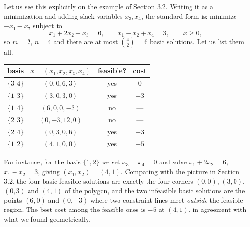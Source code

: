 \begin{example}
    Let us see this explicitly on the example of Section 3.2. Writing it as a minimization and adding slack variables $x_3, x_4$, the standard form is: minimize $-x_1 - x_2$ subject to
    $$
    x_1 + 2x_2 + x_3 = 6, \qquad x_1 - x_2 + x_4 = 3, \qquad x \geq 0,
    $$
    so $m = 2$, $n = 4$ and there are at most $\binom42 = 6$ basic solutions. Let us list them all.
    \begin{center}
    \begin{tabular}{c|c|c|c}
        basis & $x = (x_1,x_2,x_3,x_4)$ & feasible? & cost \\\hline
        $\{3,4\}$ & $(0,0,6,3)$ & yes & $0$ \\
        $\{1,3\}$ & $(3,0,3,0)$ & yes & $-3$ \\
        $\{1,4\}$ & $(6,0,0,-3)$ & no & --- \\
        $\{2,3\}$ & $(0,-3,12,0)$ & no & --- \\
        $\{2,4\}$ & $(0,3,0,6)$ & yes & $-3$ \\
        $\{1,2\}$ & $(4,1,0,0)$ & yes & $-5$
    \end{tabular}
    \end{center}
    For instance, for the basis $\{1,2\}$ we set $x_3 = x_4 = 0$ and solve $x_1 + 2x_2 = 6$, $x_1 - x_2 = 3$, giving $(x_1, x_2) = (4,1)$. Comparing with the picture in Section 3.2, the four basic feasible solutions are exactly the four corners $(0,0)$, $(3,0)$, $(0,3)$ and $(4,1)$ of the polygon, and the two infeasible basic solutions are the points $(6,0)$ and $(0,-3)$ where two constraint lines meet \emph{outside} the feasible region. The best cost among the feasible ones is $-5$ at $(4,1)$, in agreement with what we found geometrically.
\end{example}

